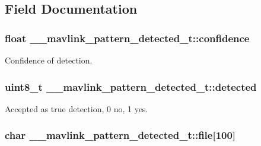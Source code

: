 \subsection{Field Documentation}
\hypertarget{struct____mavlink__pattern__detected__t_ad410e2d21aa4517d9122a7c1637a6ac3}{
\subsubsection[{confidence}]{\setlength{\rightskip}{0pt plus 5cm}float \+\_\+\+\_\+mavlink\+\_\+pattern\+\_\+detected\+\_\+t\+::confidence}}\label{struct____mavlink__pattern__detected__t_ad410e2d21aa4517d9122a7c1637a6ac3}


Confidence of detection. 

\hypertarget{struct____mavlink__pattern__detected__t_a308a87829e1c1d864ef3e0ccb7eedbe0}{
\subsubsection[{detected}]{\setlength{\rightskip}{0pt plus 5cm}uint8\+\_\+t \+\_\+\+\_\+mavlink\+\_\+pattern\+\_\+detected\+\_\+t\+::detected}}\label{struct____mavlink__pattern__detected__t_a308a87829e1c1d864ef3e0ccb7eedbe0}


Accepted as true detection, 0 no, 1 yes. 

\hypertarget{struct____mavlink__pattern__detected__t_a963eb779046c9c36e4ea3566cc8afa3e}{
\subsubsection[{file}]{\setlength{\rightskip}{0pt plus 5cm}char \+\_\+\+\_\+mavlink\+\_\+pattern\+\_\+detected\+\_\+t\+::file\mbox{[}100\mbox{]}}}\label{struct____mavlink__pattern__detected__t_a963eb779046c9c36e4ea3566cc8afa3e}


